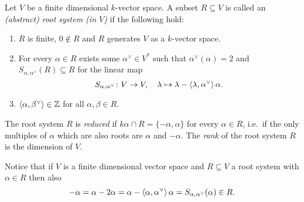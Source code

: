 \begin{defi}
 Let $V$ be a finite dimensional $k$-vector space. A subset $R \subseteq V$ is called an \emph{(abstract) root system (in $V$)} if the following hold:
 \begin{enumerate}
  \item
   $R$ is finite, $0 \notin R$ and $R$ generates $V$ as a $k$-vector space.
  \item
   For every $\alpha \in R$ exists some $\alpha^\vee \in V^*$ such that $\alpha^\vee(\alpha) = 2$ and $S_{\alpha, \alpha^\vee}(R) \subseteq R$ for the linear map
   \[
    S_{\alpha, \alpha^\vee} \colon V \to V, \quad
    \lambda \mapsto \lambda - \left\langle \lambda, \alpha^\vee\right\rangle\alpha.
   \]
   \item
    $\left\langle \alpha, \beta^\vee\right\rangle \in \mathbb{Z}$ for all $\alpha, \beta \in R$.
 \end{enumerate}
 The root system $R$ is \emph{reduced} if $k \alpha \cap R = \{-\alpha, \alpha\}$ for every $\alpha \in R$, i.e.\ if the only multiples of $\alpha$ which are also roots are $\alpha$ and $-\alpha$. The \emph{rank} of the root system $R$ is the dimension of $V$.
\end{defi}


\begin{rem}\label{rem: -alpha also in the root system}
 Notice that if $V$ is a finite dimensional vector space and $R \subseteq V$ a root system with $\alpha \in R$ then also
 \[
  -\alpha = \alpha - 2 \alpha = \alpha - \left\langle \alpha, \alpha^\vee\right\rangle \alpha = S_{\alpha, \alpha^\vee}(\alpha) \in R.
 \]
\end{rem}


